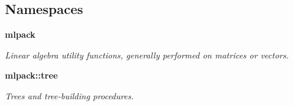 \subsection*{Namespaces}
\begin{DoxyCompactItemize}
\item 
 {\bf mlpack}
\begin{DoxyCompactList}\small\item\em Linear algebra utility functions, generally performed on matrices or vectors. \end{DoxyCompactList}\item 
 {\bf mlpack\+::tree}
\begin{DoxyCompactList}\small\item\em Trees and tree-\/building procedures. \end{DoxyCompactList}\end{DoxyCompactItemize}

